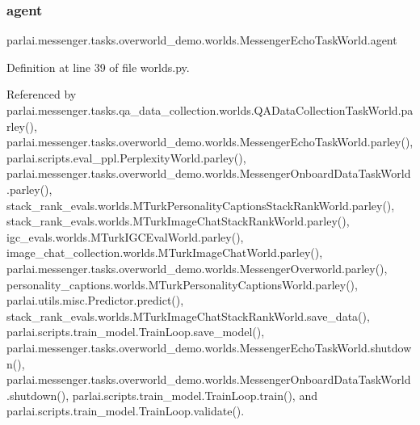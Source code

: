 \subsubsection{\texorpdfstring{agent}{agent}}
{\footnotesize\ttfamily parlai.\+messenger.\+tasks.\+overworld\+\_\+demo.\+worlds.\+Messenger\+Echo\+Task\+World.\+agent}



Definition at line 39 of file worlds.\+py.



Referenced by parlai.\+messenger.\+tasks.\+qa\+\_\+data\+\_\+collection.\+worlds.\+Q\+A\+Data\+Collection\+Task\+World.\+parley(), parlai.\+messenger.\+tasks.\+overworld\+\_\+demo.\+worlds.\+Messenger\+Echo\+Task\+World.\+parley(), parlai.\+scripts.\+eval\+\_\+ppl.\+Perplexity\+World.\+parley(), parlai.\+messenger.\+tasks.\+overworld\+\_\+demo.\+worlds.\+Messenger\+Onboard\+Data\+Task\+World.\+parley(), stack\+\_\+rank\+\_\+evals.\+worlds.\+M\+Turk\+Personality\+Captions\+Stack\+Rank\+World.\+parley(), stack\+\_\+rank\+\_\+evals.\+worlds.\+M\+Turk\+Image\+Chat\+Stack\+Rank\+World.\+parley(), igc\+\_\+evals.\+worlds.\+M\+Turk\+I\+G\+C\+Eval\+World.\+parley(), image\+\_\+chat\+\_\+collection.\+worlds.\+M\+Turk\+Image\+Chat\+World.\+parley(), parlai.\+messenger.\+tasks.\+overworld\+\_\+demo.\+worlds.\+Messenger\+Overworld.\+parley(), personality\+\_\+captions.\+worlds.\+M\+Turk\+Personality\+Captions\+World.\+parley(), parlai.\+utils.\+misc.\+Predictor.\+predict(), stack\+\_\+rank\+\_\+evals.\+worlds.\+M\+Turk\+Image\+Chat\+Stack\+Rank\+World.\+save\+\_\+data(), parlai.\+scripts.\+train\+\_\+model.\+Train\+Loop.\+save\+\_\+model(), parlai.\+messenger.\+tasks.\+overworld\+\_\+demo.\+worlds.\+Messenger\+Echo\+Task\+World.\+shutdown(), parlai.\+messenger.\+tasks.\+overworld\+\_\+demo.\+worlds.\+Messenger\+Onboard\+Data\+Task\+World.\+shutdown(), parlai.\+scripts.\+train\+\_\+model.\+Train\+Loop.\+train(), and parlai.\+scripts.\+train\+\_\+model.\+Train\+Loop.\+validate().

\mbox{\label{classparlai_1_1messenger_1_1tasks_1_1overworld__demo_1_1worlds_1_1MessengerEchoTaskWorld_ac21cf047d6675fa029aa485bda2ac3d7}} 

